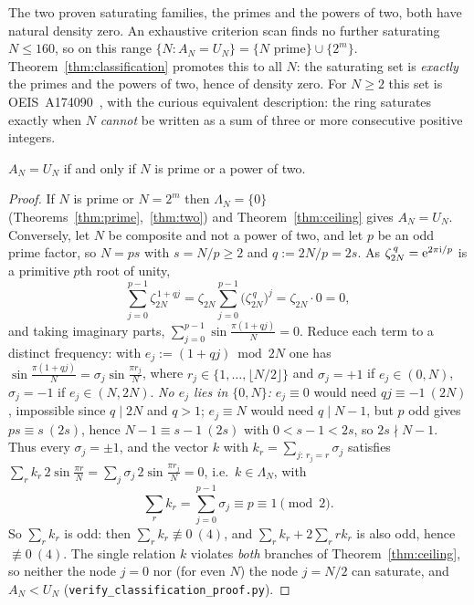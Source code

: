 \begin{corollary}\label{cor:density}
The two proven saturating families, the primes and the powers of two, both have natural density zero.
An exhaustive criterion scan finds no further saturating $N\le160$, so on this range
$\{N:A_N=U_N\}=\{N\text{ prime}\}\cup\{2^m\}$. Theorem~\ref{thm:classification} promotes this to all $N$:
the saturating set is \emph{exactly} the primes and the powers of two, hence of density zero. For $N\ge2$ this
set is OEIS~A174090~\cite{OEIS}, with the curious equivalent description: the ring saturates exactly when $N$
\emph{cannot} be written as a sum of three or more consecutive positive integers.
\end{corollary}

\begin{theorem}\label{thm:classification}
$A_N=U_N$ if and only if $N$ is prime or a power of two.
\end{theorem}

\begin{proof}
If $N$ is prime or $N=2^m$ then $\Lambda_N=\{0\}$ (Theorems~\ref{thm:prime},~\ref{thm:two}) and
Theorem~\ref{thm:ceiling} gives $A_N=U_N$. Conversely, let $N$ be composite and not a power of two, and
let $p$ be an odd prime factor, so $N=ps$ with $s=N/p\ge2$ and $q:=2N/p=2s$. As
$\zeta_{2N}^{\,q}=\mathrm{e}^{2\pi\mathrm i/p}$ is a primitive $p$th root of unity,
\[
  \sum_{j=0}^{p-1}\zeta_{2N}^{\,1+qj}=\zeta_{2N}\sum_{j=0}^{p-1}\bigl(\zeta_{2N}^{\,q}\bigr)^{j}=\zeta_{2N}\cdot0=0,
\]
and taking imaginary parts, $\sum_{j=0}^{p-1}\sin\frac{\pi(1+qj)}{N}=0$. Reduce each term to a distinct
frequency: with $e_j:=(1+qj)\bmod 2N$ one has $\sin\frac{\pi(1+qj)}{N}=\sigma_j\sin\frac{\pi r_j}{N}$, where
$r_j\in\{1,\dots,\lfloor N/2\rfloor\}$ and $\sigma_j=+1$ if $e_j\in(0,N)$, $\sigma_j=-1$ if $e_j\in(N,2N)$.
\emph{No $e_j$ lies in $\{0,N\}$:} $e_j\equiv0$ would need $qj\equiv-1\ (2N)$, impossible since $q\mid 2N$
and $q>1$; $e_j\equiv N$ would need $q\mid N-1$, but $p$ odd gives $ps\equiv s\ (2s)$, hence
$N-1\equiv s-1\ (2s)$ with $0<s-1<2s$, so $2s\nmid N-1$. Thus every $\sigma_j=\pm1$, and the vector $k$
with $k_r=\sum_{j:\,r_j=r}\sigma_j$ satisfies $\sum_r k_r\,2\sin\frac{\pi r}N=\sum_j\sigma_j\,2\sin\frac{\pi r_j}N=0$,
i.e.\ $k\in\Lambda_N$, with
\[
  \sum_r k_r=\sum_{j=0}^{p-1}\sigma_j\equiv p\equiv1\pmod 2 .
\]
So $\sum_r k_r$ is odd: then $\sum_r k_r\not\equiv0\ (4)$, and $\sum_r k_r+2\sum_r rk_r$ is also odd, hence
$\not\equiv0\ (4)$. The single relation $k$ violates \emph{both} branches of Theorem~\ref{thm:ceiling}, so
neither the node $j=0$ nor (for even $N$) the node $j=N/2$ can saturate, and $A_N<U_N$
(\texttt{verify\_classification\_proof.py}). \end{proof}

